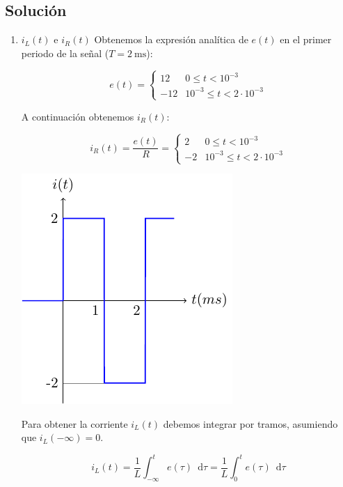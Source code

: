 \documentclass[10pt]{article}
\begin{document}
\subsection*{Solución}

\begin{enumerate}
\item $i_L(t)$ e $i_R(t)$
  Obtenemos la expresión analítica de $e(t)$ en el primer periodo de la señal ($T = \SI{2}{\milli\second}$):
  
  \[
    e(t) = %
    \begin{cases}
      12 & 0 \leq t < 10^{-3} \\
      -12 & 10^{-3} \leq t < 2 \cdot 10^{-3}
    \end{cases}
  \]

  A continuación obtenemos $i_R(t)$:

  \begin{minipage}[c]{0.5\linewidth}
    \[
      i_R(t) = \frac{e(t)}{R} = %
      \begin{cases}
        2 & 0 \leq t < 10^{-3} \\
        -2 & 10^{-3} \leq t < 2 \cdot 10^{-3}
      \end{cases}
    \]
  \end{minipage}
  \begin{minipage}[c]{0.5\linewidth}
    \includegraphics{../figs/tren_pulsos2_solucion.pdf}
  \end{minipage}

  Para obtener la corriente $i_L(t)$ debemos integrar por tramos, asumiendo que $i_L(-\infty) = 0$.

  \[
    i_L(t) = \frac{1}{L} \int_{-\infty}^t e(\tau) \enspace \mathrm{d}\tau = \frac{1}{L} \int_0^t e(\tau) \enspace \mathrm{d}\tau
  \]


\end{enumerate}
\end{document}

